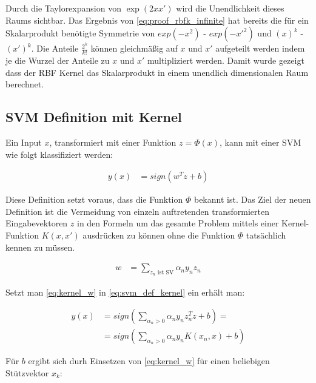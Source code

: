\documentclass[a4paper,11pt,twoside]{scrreprt}
\begin{document}
Durch die Taylorexpansion von $\exp{(2xx')}$ wird die Unendlichkeit dieses Raums sichtbar. Das Ergebnis von \autoref{eq:proof_rbfk_infinite} hat bereits die für ein Skalarprodukt benötigte Symmetrie von $exp(-x^{2})$ - $exp(-x'^{2})$ und $(x)^{k}$ - $(x')^{k}$. Die Anteile $\frac{2^k}{k!}$ können gleichmäßig auf $x$ und $x'$ aufgeteilt werden indem je die Wurzel der Anteile zu $x$ und $x'$ multipliziert werden. Damit wurde gezeigt dass der \ac{RBF} Kernel das Skalarprodukt in einem unendlich dimensionalen Raum berechnet. 

\subsection{SVM Definition mit Kernel}
Ein Input $x$, transformiert mit einer Funktion $z = \Phi(x)$, kann mit einer \ac{SVM} wie folgt klassifiziert werden:

\begin{equation} \label{eq:svm_def_kernel}
	\begin{aligned}
		y(x) &= sign(w^{T} z + b)
	\end{aligned}
\end{equation}

Diese Definition setzt voraus, dass die Funktion $\Phi$ bekannt ist. Das Ziel der neuen Definition ist die Vermeidung von einzeln auftretenden transformierten Eingabevektoren $z$ in den Formeln um das gesamte Problem mittels einer Kernel-Funktion $K(x, x')$ ausdrücken zu können ohne die Funktion $\Phi$ tatsächlich kennen zu müssen.

\begin{equation} \label{eq:kernel_w}
	\begin{aligned}
		w &= \sum_{z_{n} \text{ ist SV}} \alpha_{n} y_{n} z_{n}
	\end{aligned}
\end{equation}

Setzt man \autoref{eq:kernel_w} in \autoref{eq:svm_def_kernel} ein erhält man:

\begin{equation} \label{eq:svm_def_kernel2}
	\begin{aligned}
		y(x) &= sign(\sum_{\alpha_{n} > 0} \alpha_{n} y_{n} z_{n}^{T} z + b) = \\
		&= sign(\sum_{\alpha_{n} > 0} \alpha_{n} y_{n} K(x_{n}, x) + b)
	\end{aligned}
\end{equation}

Für $b$ ergibt sich durh Einsetzen von \autoref{eq:kernel_w} für einen beliebigen Stützvektor $x_{k}$:
\end{document}
